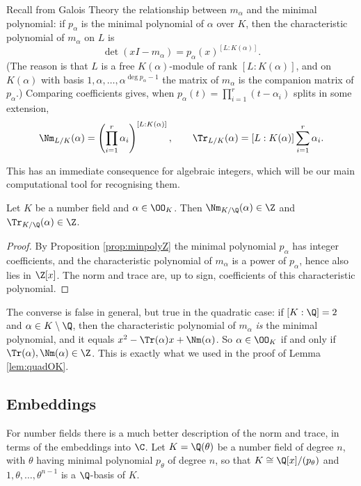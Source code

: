 Recall from Galois Theory the relationship between $m_\alpha$ and the minimal polynomial: if $p_\alpha$ is the minimal polynomial of $\alpha$ over $K$, then the characteristic polynomial of $m_\alpha$ on $L$ is
$$\det(x I - m_\alpha) = p_\alpha(x)^{[L : K(\alpha)]}.$$
(The reason is that $L$ is a free $K(\alpha)$-module of rank $[L:K(\alpha)]$, and on $K(\alpha)$ with basis $1, \alpha, \dots, \alpha^{\deg p_\alpha - 1}$ the matrix of $m_\alpha$ is the companion matrix of $p_\alpha$.) Comparing coefficients gives, when $p_\alpha(t) = \prod_{i=1}^r (t - \alpha_i)$ splits in some extension,
$$\Nm_{L/K}(\alpha) = \left(\prod_{i=1}^r \alpha_i\right)^{[L:K(\alpha)]}, \qquad \Tr_{L/K}(\alpha) = [L:K(\alpha)]\sum_{i=1}^r \alpha_i.$$

This has an immediate consequence for algebraic integers, which will be our main computational tool for recognising them.

\begin{lemma}\label{lem:normtraceZ}
	Let $K$ be a number field and $\alpha \in \OO_K$. Then $\Nm_{K/\Q}(\alpha) \in \Z$ and $\Tr_{K/\Q}(\alpha) \in \Z$.
\end{lemma}

\begin{proof}
	By Proposition \ref{prop:minpolyZ} the minimal polynomial $p_\alpha$ has integer coefficients, and the characteristic polynomial of $m_\alpha$ is a power of $p_\alpha$, hence also lies in $\Z[x]$. The norm and trace are, up to sign, coefficients of this characteristic polynomial.
\end{proof}

\begin{remark}
	The converse is false in general, but true in the quadratic case: if $[K:\Q] = 2$ and $\alpha \in K \setminus \Q$, then the characteristic polynomial of $m_\alpha$ \emph{is} the minimal polynomial, and it equals $x^2 - \Tr(\alpha)x + \Nm(\alpha)$. So $\alpha \in \OO_K$ if and only if $\Tr(\alpha), \Nm(\alpha) \in \Z$. This is exactly what we used in the proof of Lemma \ref{lem:quadOK}.
\end{remark}

\subsection{Embeddings}

For number fields there is a much better description of the norm and trace, in terms of the embeddings into $\C$. Let $K = \Q(\theta)$ be a number field of degree $n$, with $\theta$ having minimal polynomial $p_\theta$ of degree $n$, so that $K \cong \Q[x]/(p_\theta)$ and $1, \theta, \dots, \theta^{n-1}$ is a $\Q$-basis of $K$.


